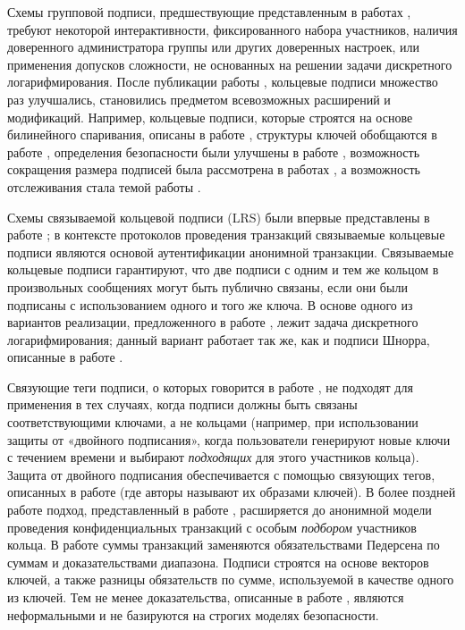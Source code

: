 \documentclass{llncs}
\begin{document}
Схемы групповой подписи, предшествующие представленным в работах \cite{rivest,liu2004linkable}, требуют некоторой интерактивности, фиксированного набора участников, наличия доверенного администратора группы или других доверенных настроек, или применения допусков сложности, не основанных на решении задачи дискретного логарифмирования. После публикации работы \cite{rivest}, кольцевые подписи множество раз улучшались, становились предметом всевозможных расширений и модификаций. Например, кольцевые подписи, которые строятся на основе билинейного спаривания, описаны в работе \cite{zhang2002id}, структуры ключей обобщаются в работе \cite{abe20021}, определения безопасности были улучшены в работе \cite{bender2006ring}, возможность сокращения размера подписей была рассмотрена в работах \cite{fujisaki2011sub,gu2018constant}, а возможность отслеживания стала темой работы \cite{fujisaki2007traceable}.

Схемы связываемой кольцевой подписи (LRS) были впервые представлены в работе \cite{liu2004linkable}; в контексте протоколов проведения транзакций связываемые кольцевые подписи являются основой аутентификации анонимной транзакции. Связываемые кольцевые подписи гарантируют, что две подписи с одним и тем же кольцом в произвольных сообщениях могут быть публично связаны, если они были подписаны с использованием одного и того же ключа. В основе одного из вариантов реализации, предложенного в работе \cite{liu2004linkable}, лежит задача дискретного логарифмирования; данный вариант работает так же, как и подписи Шнорра, описанные в работе \cite{schnorr1991efficient}.

Связующие теги подписи, о которых говорится в работе \cite{liu2004linkable}, не подходят для применения в тех случаях, когда подписи должны быть связаны соответствующими ключами, а не кольцами (например, при использовании защиты от «двойного подписания», когда пользователи генерируют новые ключи с течением времени и выбирают \textit{подходящих} для этого участников кольца). Защита от двойного подписания обеспечивается с помощью связующих тегов, описанных в работе \cite{van2013cryptonote} (где авторы называют их образами ключей). В более поздней работе \cite{noether2016ring} подход, представленный в работе \cite{liu2004linkable}, расширяется до анонимной модели проведения конфиденциальных транзакций с особым \textit{подбором} участников кольца. В работе \cite{noether2016ring} суммы транзакций заменяются обязательствами Педерсена по суммам и доказательствами диапазона. Подписи строятся на основе векторов ключей, а также разницы обязательств по сумме, используемой в качестве одного из ключей. Тем не менее доказательства, описанные в работе \cite{noether2016ring}, являются неформальными и не базируются на строгих моделях безопасности.
\end{document}
